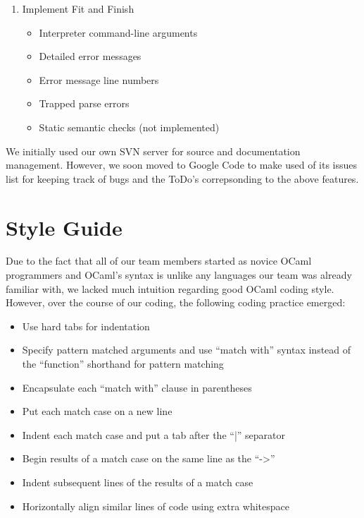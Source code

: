 \begin{enumerate}
\item Implement Fit and Finish
\begin{itemize}
	\item Interpreter command-line arguments
	\item Detailed error messages
	\item Error message line numbers
	\item Trapped parse errors
	\item Static semantic checks (not implemented)
\end{itemize}

\end{enumerate}

We initially used our own SVN server for source and documentation management.  However, we soon moved to Google Code to make used of its issues list for keeping track of bugs and the ToDo's correpsonding to the above features.

\section{Style Guide}

Due to the fact that all of our team members started as novice OCaml programmers and OCaml's syntax is unlike any languages our team was already familiar with, we lacked much intuition regarding good OCaml coding style.  However, over the course of our coding, the following coding practice emerged:

\begin{itemize}
	\item Use hard tabs for indentation
	\item Specify pattern matched arguments and use ``match with'' syntax instead of the ``function'' shorthand for pattern matching
	\item Encapsulate each ``match with'' clause in parentheses
	\item Put each match case on a new line
	\item Indent each match case and put a tab after the ``|'' separator
	\item Begin results of a match case on the same line as the ``->''
	\item Indent subsequent lines of the results of a match case
	\item Horizontally align similar lines of code using extra whitespace
\end{itemize}

